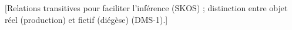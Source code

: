 






[Relations transitives pour faciliter l'inférence (SKOS) ; distinction entre objet réel (production) et fictif (diégèse) (DMS-1).]


